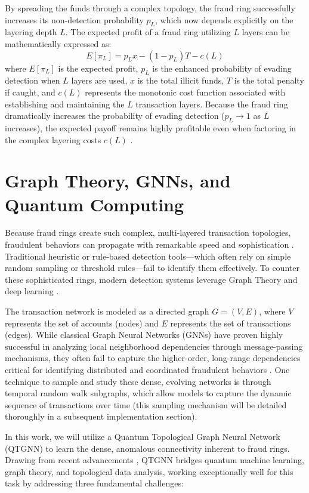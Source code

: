 By spreading the funds through a complex topology, the fraud ring successfully increases its non-detection probability $p_L$, which now depends explicitly on the layering depth $L$. The expected profit of a fraud ring utilizing $L$ layers can be mathematically expressed as:
\begin{equation}
    E[\pi_L] = p_L x - (1-p_L)T - c(L)
\end{equation}
where $E[\pi_L]$ is the expected profit, $p_L$ is the enhanced probability of evading detection when $L$ layers are used, $x$ is the total illicit funds, $T$ is the total penalty if caught, and $c(L)$ represents the monotonic cost function associated with establishing and maintaining the $L$ transaction layers. Because the fraud ring dramatically increases the probability of evading detection ($p_L \to 1$ as $L$ increases), the expected payoff remains highly profitable even when factoring in the complex layering costs $c(L)$ \cite{contreras2026strategic}. 

\section{Graph Theory, GNNs, and Quantum Computing}
Because fraud rings create such complex, multi-layered transaction topologies, fraudulent behaviors can propagate with remarkable speed and sophistication \cite{awoyemi2017}. Traditional heuristic or rule-based detection tools---which often rely on simple random sampling or threshold rules---fail to identify them effectively. To counter these sophisticated rings, modern detection systems leverage Graph Theory and deep learning \cite{li2025scamsweeper}.

The transaction network is modeled as a directed graph $G = (V, E)$, where $V$ represents the set of accounts (nodes) and $E$ represents the set of transactions (edges). While classical Graph Neural Networks (GNNs) have proven highly successful in analyzing local neighborhood dependencies through message-passing mechanisms, they often fail to capture the higher-order, long-range dependencies critical for identifying distributed and coordinated fraudulent behaviors \cite{motie2024}. One technique to sample and study these dense, evolving networks is through temporal random walk subgraphs, which allow models to capture the dynamic sequence of transactions over time (this sampling mechanism will be detailed thoroughly in a subsequent implementation section).

In this work, we will utilize a Quantum Topological Graph Neural Network (QTGNN) to learn the dense, anomalous connectivity inherent to fraud rings. Drawing from recent advancements \cite{mainarticle}, QTGNN bridges quantum machine learning, graph theory, and topological data analysis, working exceptionally well for this task by addressing three fundamental challenges:

